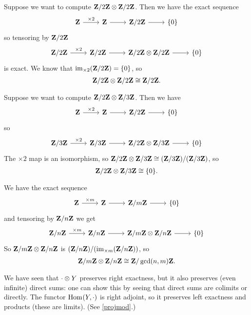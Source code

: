 \documentclass[11pt, oneside,margin=1in]{article}
\begin{document}
\begin{example}\label{}
Suppose we want to compute $\mathbf Z / 2\mathbf Z\otimes \mathbf Z / 2\mathbf Z$. Then we have the exact sequence 
\[
\begin{tikzcd}
\Z \arrow[r, "\times 2"] & \Z\arrow[r]& \Zmod 2\arrow[r] & \{0\}
\end{tikzcd}
\]
so tensoring by $\mathbf Z / 2\mathbf Z$ 
\[
\begin{tikzcd}
\Zmod 2 \arrow[r,"\times 2"] & \Zmod 2\arrow[r]& \Zmod 2\tensor \Zmod 2\arrow[r] & \{0\}
\end{tikzcd}
\]
is exact. We know that $\operatorname{im}_{\times 2}(\mathbf Z / 2\mathbf Z)=\{0\}$, so \begin{align*}
	\mathbf Z / 2\mathbf Z\otimes \mathbf Z / 2\mathbf Z \cong \mathbf Z / 2\mathbf Z.
\end{align*}

Suppose we want to compute $\mathbf Z / 2\mathbf Z\otimes \mathbf Z / 3\mathbf Z$. Then we have 
\[
\begin{tikzcd}
\Z \arrow[r, "\times 2"] & \Z\arrow[r]& \Zmod 2\arrow[r] & \{0\}
\end{tikzcd}
\]
so
\[
\begin{tikzcd}
\Zmod 3 \arrow[r,"\times 2"] & \Zmod 3\arrow[r]& \Zmod 2\tensor \Zmod 3\arrow[r] & \{0\}
\end{tikzcd}
\]
The $\times 2$ map is an isomorphism, so $\mathbf Z / 2\mathbf Z\otimes \mathbf Z / 3\mathbf Z \cong (\mathbf Z / 3\mathbf Z)/ (\mathbf Z / 3\mathbf Z)$, so 
\begin{align*}
	\mathbf Z / 2\mathbf Z\otimes\mathbf Z / 3\mathbf Z\cong \{0\}.
\end{align*}
\end{example}
\begin{example}\label{}
We have the exact sequence
\[
\begin{tikzcd}
  \Z \arrow[r, "\times m"] & \Z\arrow[r]& \Zmod m\arrow[r] & \{0\}
\end{tikzcd}
\]
and tensoring by $\mathbf Z / n\mathbf Z$ we get 
\[
\begin{tikzcd}
\Zmod n \arrow[r,"\times m"] & \Zmod n\arrow[r]& \Zmod m\tensor \Zmod n\arrow[r] & \{0\}
\end{tikzcd}
\]
So $\mathbf Z / m\mathbf Z\otimes \mathbf Z / n\mathbf Z$ is $ (\mathbf Z / n\mathbf Z) / (\operatorname{im}_{\times m} (\mathbf Z / n\mathbf Z))$, so
\begin{align*}
	\mathbf Z / m\mathbf Z\otimes \mathbf Z / n\mathbf Z \cong \mathbf Z / \gcd(n,m)\mathbf Z. 
\end{align*}
\end{example}

We have seen that $\cdot \otimes Y$ preserves right exactness, but it also preserves (even infinite) direct sums: one can show this by seeing that direct sums are colimits or directly. The functor $\operatorname{Hom}_{}(Y, \cdot)$ is right adjoint, so it preserves left exactness and products (these are limits). (See \cref{projmod}.) 
\end{document}
